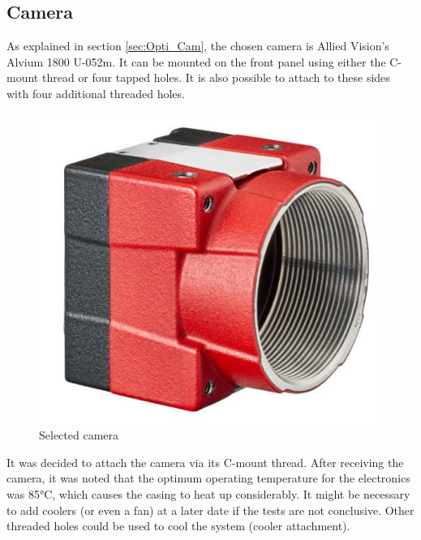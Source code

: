 \subsection{Camera}
As explained in section \ref{sec:Opti_Cam}, the chosen camera is Allied Vision's Alvium 1800 U-052m. \newline
It can be mounted on the front panel using either the C-mount thread or four tapped 
holes. It is also possible to attach to these sides with four additional threaded holes.
\begin{figure}[H]
    \centering
    \includegraphics[scale=0.35]{assets/figures/Mechanical Design/Camera.png}
    \caption{Selected camera}
    \label{fig:Camera}
\end{figure}
It was decided to attach the camera via its C-mount thread. After receiving the camera, it was noted that the 
optimum operating temperature for the electronics was 85°C, which causes the casing to heat up considerably. 
It might be necessary to add coolers (or even a fan) at a later date if the tests are not conclusive. 
Other threaded holes could be used to cool the system (cooler attachment).
